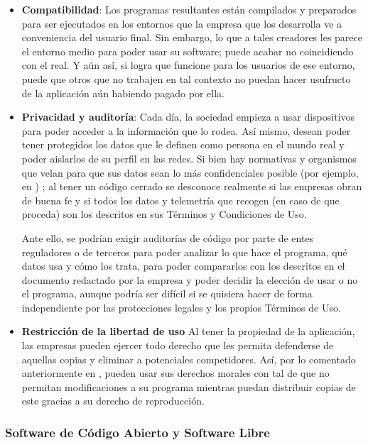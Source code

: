 \begin{itemize}
	\item \textbf{Compatibilidad}: Los programas resultantes están compilados y preparados para ser ejecutados en los entornos que la empresa que los desarrolla ve a conveniencia del usuario final. Sin embargo, lo que a tales creadores les parece el entorno medio para poder usar su software; puede acabar no coincidiendo con el real. Y aún así, si logra que funcione para los usuarios de ese entorno, puede que otros que no trabajen en tal contexto no puedan hacer usufructo de la aplicación aún habiendo pagado por ella.
	
	\item \textbf{Privacidad y auditoría}: Cada día, la sociedad empieza a usar dispositivos para poder acceder a la información que lo rodea. Así mismo, desean poder tener protegidos los datos que le definen como persona en el mundo real y poder aislarlos de su perfil en las redes. Si bien hay normativas y organismos que velan para que sus datos sean lo más confidenciales posible (por ejemplo, en \cite{lopd-2018}) ; al tener un código cerrado se desconoce realmente si las empresas obran de buena fe y si todos los datos y telemetría que recogen (en caso de que proceda) son los descritos en sus Términos y Condiciones de Uso.
	
	Ante ello, se podrían exigir auditorías de código por parte de entes reguladores o de terceros para poder analizar lo que hace el programa, qué datos usa y cómo los trata, para poder compararlos con los descritos en el documento redactado por la empresa y poder decidir la elección de usar o no el programa, aunque podría ser difícil si se quisiera hacer de forma independiente por las protecciones legales y los propios Términos de Uso.
	
	\item \textbf{Restricción de la libertad de uso} Al tener la propiedad de la aplicación, las empresas pueden ejercer todo derecho que les permita defenderse de aquellas copias y eliminar a potenciales competidores. Así, por lo comentado anteriormente en \cite{propint-1996}, pueden usar sus derechos morales con tal de que no permitan modificaciones a su programa mientras puedan distribuir copias de este gracias a su derecho de reproducción.
\end{itemize}

\subsubsection{Software de Código Abierto y Software Libre}

